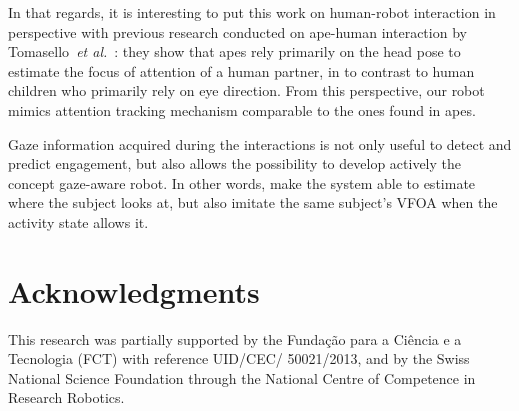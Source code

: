 \documentclass{sig-alternate}
\newcommand{\etal}{\textit{et al.}\xspace}
\begin{document}
In that regards, it is interesting to put this work on human-robot interaction
in perspective with previous research conducted on ape-human interaction by
Tomasello~\etal~\cite{tomasello2007reliance}: they show that apes rely primarily
on the head pose to estimate the focus of attention of a human partner, in to contrast
to human children who primarily rely on eye direction. From this perspective,
our robot mimics attention tracking mechanism comparable to the ones found in apes.

Gaze information acquired during the interactions is not only useful to detect
and predict engagement, but also allows the possibility to develop actively the
concept gaze-aware robot. In other words, make the system able to estimate where
the subject looks at, but also imitate the same subject's VFOA when the activity
state allows it. 

\section*{Acknowledgments}

This research was partially supported by the Funda\c{c}\~{a}o para a Ci\^{e}ncia
e a Tecnologia (FCT) with reference UID/CEC/ 50021/2013, and by the Swiss
National Science Foundation through the National Centre of Competence in
Research Robotics.



\end{document}
